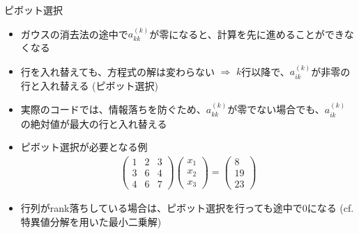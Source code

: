 \begin{frame}[t,fragile]{ピボット選択}
  \begin{itemize}
  \item ガウスの消去法の途中で$a_{kk}^{(k)}$が零になると、計算を先に進めることができなくなる
  \item 行を入れ替えても、方程式の解は変わらない $\Rightarrow$ $k$行以降で、$a_{ik}^{(k)}$が非零の行と入れ替える (ピボット選択)
  \item 実際のコードでは、情報落ちを防ぐため、$a_{kk}^{(k)}$が零でない場合でも、$a_{ik}^{(k)}$の絶対値が最大の行と入れ替える
  \item ピボット選択が必要となる例
    \begin{align*}
      \begin{pmatrix} 1 & 2 & 3 \\ 3 & 6 & 4 \\ 4 & 6 & 7 \end{pmatrix} \begin{pmatrix} x_1 \\ x_2 \\ x_3 \end{pmatrix} = \begin{pmatrix} 8 \\ 19 \\ 23 \end{pmatrix}
    \end{align*}
    \item 行列がrank落ちしている場合は、ピボット選択を行っても途中で0になる (cf. 特異値分解を用いた最小二乗解)
  \end{itemize}
\end{frame}
